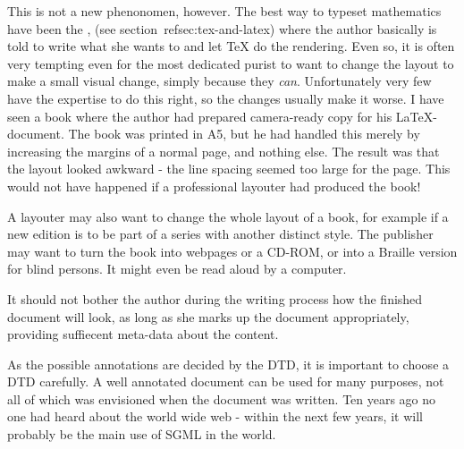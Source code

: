 This is not a new phenonomen, however.  The best way to typeset
mathematics have been the , (see section~\textsf{ref{sec:tex-and-latex}}) where the
author basically is told to write what she wants to and let {TeX} do
the rendering.  Even so, it is often very tempting even for the most
dedicated purist to want to change the layout to make a small visual
change, simply because they \textit{can}.  Unfortunately very few have
the expertise to do this right, so the changes usually make it worse.
I have seen a book where the author had prepared camera-ready copy for
his {\LaTeX}-document.  The book was printed in A5, but he had handled
this merely by increasing the margins of a normal page, and nothing
else.  The result was that the layout looked awkward - the line
spacing seemed too large for the page.  This would not have happened
if a professional layouter had produced the book!

A layouter may also want to change the whole layout of a book, for
example if a new edition is to be part of a series with another
distinct style.  The publisher may want to turn the book into webpages
or a CD-ROM, or into a Braille version for blind persons.  It might
even be read aloud by a computer.

It should not bother the author during the writing process how the
finished document will look, as long as she marks up the document
appropriately, providing suffiecent meta-data about the content.

As the possible annotations are decided by the DTD, it is important to
choose a DTD carefully.  A well annotated document can be used for
many purposes, not all of which was envisioned when the document was
written.  Ten years ago no one had heard about the world wide web -
within the next few years, it will probably be the main use of SGML in
the world.








